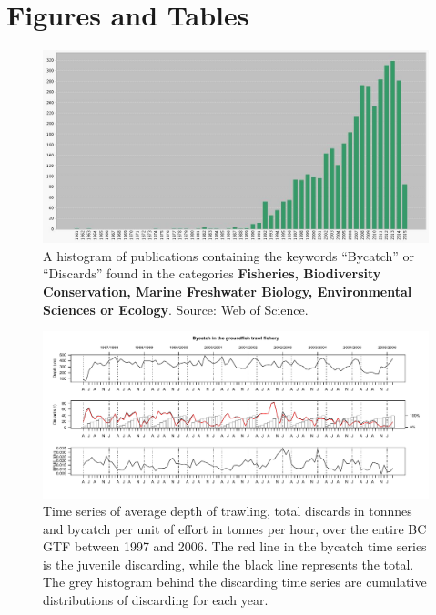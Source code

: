 \documentclass{article}
\begin{document}



\newpage

\section*{Figures and Tables}


\begin{figure}[!h]
\begin{center}
\includegraphics[scale = 0.4]{Images/bdPubsWoS.jpeg}
\end{center}
\caption{ A histogram of publications containing the keywords ``Bycatch'' or ``Discards'' found in the categories {\bf Fisheries, Biodiversity Conservation, Marine Freshwater Biology, Environmental Sciences or Ecology}. Source: Web of Science.}\label{fig:WoSPubRep}
\end{figure}

\begin{figure}[!h]
\begin{center}
\includegraphics[scale = 0.55]{Images/ts.pdf}
\end{center}
\caption{Time series of average depth of trawling, total discards in tonnnes and bycatch per unit of effort in tonnes per hour, over the entire BC GTF between 1997 and 2006. The red line in the bycatch time series is the juvenile discarding, while the black line represents the total. The grey histogram behind the discarding time series are cumulative distributions of discarding for each year.} \label{fig:bycatchTS}
\end{figure}
\end{document}
